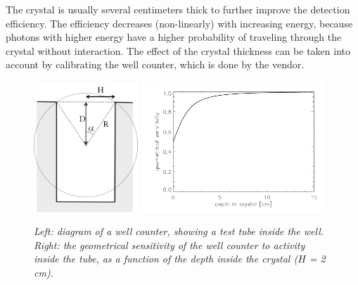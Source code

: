 \documentclass[11pt,oneside]{article}
\begin{document}
The crystal is usually several centimeters thick to further improve
the detection efficiency. The efficiency decreases (non-linearly) with
increasing energy, because photons with higher energy have a higher
probability of traveling through the crystal without interaction. The
effect of the crystal thickness can be taken into account by
calibrating the well counter, which is done by the vendor.
%
\begin{figure}[tb]
  \includegraphics[width=0.35\textwidth]{figs/fig_wellcountersens.pdf}
  \includegraphics[width=0.61\textwidth]{figs/fig_wellcounter2.pdf}
\caption{\label{fig:wellcountersens} \emph{Left: diagram of a well counter, showing a
    test tube inside the well. Right: the geometrical sensitivity of
    the well counter to activity inside the tube, as a function of the
    depth inside the crystal ($H$ = 2 cm).}}
\end{figure}
\end{document}
